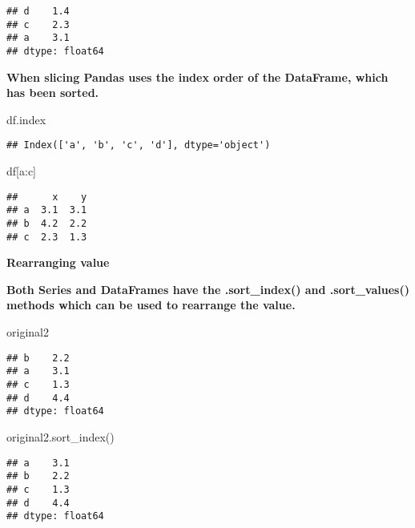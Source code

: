 \documentclass[
]{book}
\newenvironment{Shaded}{\begin{snugshade}}{\end{snugshade}}
\newcommand{\NormalTok}[1]{#1}
\newcommand{\StringTok}[1]{\textcolor[rgb]{0.31,0.60,0.02}{#1}}
\begin{document}
\begin{verbatim}
## d    1.4
## c    2.3
## a    3.1
## dtype: float64
\end{verbatim}

{\textbf{When slicing Pandas uses the index order of the DataFrame, which has been sorted.}}

\begin{Shaded}
\begin{Highlighting}[]
\NormalTok{df.index }
\end{Highlighting}
\end{Shaded}

\begin{verbatim}
## Index(['a', 'b', 'c', 'd'], dtype='object')
\end{verbatim}

\begin{Shaded}
\begin{Highlighting}[]
\NormalTok{df[}\StringTok{\textquotesingle{}a\textquotesingle{}}\NormalTok{:}\StringTok{\textquotesingle{}c\textquotesingle{}}\NormalTok{]}
\end{Highlighting}
\end{Shaded}

\begin{verbatim}
##      x    y
## a  3.1  3.1
## b  4.2  2.2
## c  2.3  1.3
\end{verbatim}

\textbf{Rearranging value}

{\textbf{Both Series and DataFrames have the .sort\_index() and .sort\_values() methods which can be used to rearrange the value.}}

\begin{Shaded}
\begin{Highlighting}[]
\NormalTok{original2}
\end{Highlighting}
\end{Shaded}

\begin{verbatim}
## b    2.2
## a    3.1
## c    1.3
## d    4.4
## dtype: float64
\end{verbatim}

\begin{Shaded}
\begin{Highlighting}[]
\NormalTok{original2.sort\_index()}
\end{Highlighting}
\end{Shaded}

\begin{verbatim}
## a    3.1
## b    2.2
## c    1.3
## d    4.4
## dtype: float64
\end{verbatim}
\end{document}
